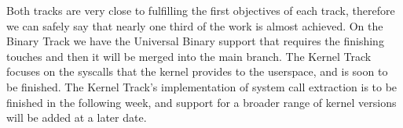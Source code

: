 
Both tracks are very close to fulfilling the first objectives of each track,
therefore we can safely say that nearly one third of the work is almost
achieved. On the Binary Track we have the Universal Binary support that
requires the finishing touches and then it will be merged into the main
branch. The Kernel Track focuses on the syscalls that the kernel provides to
the userspace, and is soon to be finished. The Kernel Track's implementation
of system call extraction is to be finished in the following week, and support
for a broader range of kernel versions will be added at a later date.
